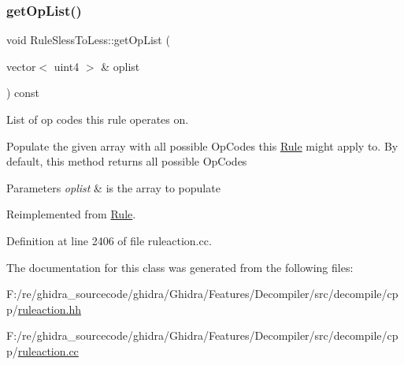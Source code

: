 \subsubsection{\texorpdfstring{getOpList()}{getOpList()}}
{\footnotesize\ttfamily void Rule\+Sless\+To\+Less\+::get\+Op\+List (\begin{DoxyParamCaption}\item[{vector$<$ uint4 $>$ \&}]{oplist }\end{DoxyParamCaption}) const\hspace{0.3cm}{\ttfamily [virtual]}}



List of op codes this rule operates on. 

Populate the given array with all possible Op\+Codes this \mbox{\hyperlink{class_rule}{Rule}} might apply to. By default, this method returns all possible Op\+Codes 
\begin{DoxyParams}{Parameters}
{\em oplist} & is the array to populate \\
\hline
\end{DoxyParams}


Reimplemented from \mbox{\hyperlink{class_rule_a4023bfc7825de0ab866790551856d10e}{Rule}}.



Definition at line 2406 of file ruleaction.\+cc.



The documentation for this class was generated from the following files\+:\begin{DoxyCompactItemize}
\item 
F\+:/re/ghidra\+\_\+sourcecode/ghidra/\+Ghidra/\+Features/\+Decompiler/src/decompile/cpp/\mbox{\hyperlink{ruleaction_8hh}{ruleaction.\+hh}}\item 
F\+:/re/ghidra\+\_\+sourcecode/ghidra/\+Ghidra/\+Features/\+Decompiler/src/decompile/cpp/\mbox{\hyperlink{ruleaction_8cc}{ruleaction.\+cc}}\end{DoxyCompactItemize}
